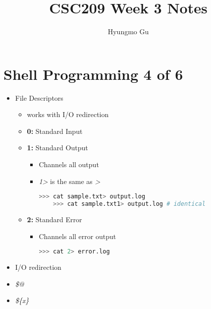 \documentclass[12pt]{article}
\begin{document}
\title{CSC209 Week 3 Notes}
\author{Hyungmo Gu}
\maketitle

\section*{Shell Programming 4 of 6}

\bigskip

\begin{itemize}
    \item File Descriptors
    \begin{itemize}
    \item works with I/O redirection
    \item \textbf{0:} Standard Input
    \item \textbf{1:} Standard Output
    \begin{itemize}
    \item Channels all output
    \item \textit{1\textgreater} is the same as \textit{\textgreater}

    \begin{lstlisting}[language=bash]
    >>> cat sample.txt> output.log
    >>> cat sample.txt1> output.log # identical
    \end{lstlisting}
    \end{itemize}

    \item \textbf{2:} Standard Error
    \begin{itemize}
    \item Channels all error output

    \begin{lstlisting}[language=bash]
    >>> cat 2> error.log
    \end{lstlisting}
    \end{itemize}

    \end{itemize}
    \item I/O redirection
    \item \textit{\$@}
    \item \textit{\$\{x\}}
\end{itemize}
\end{document}
